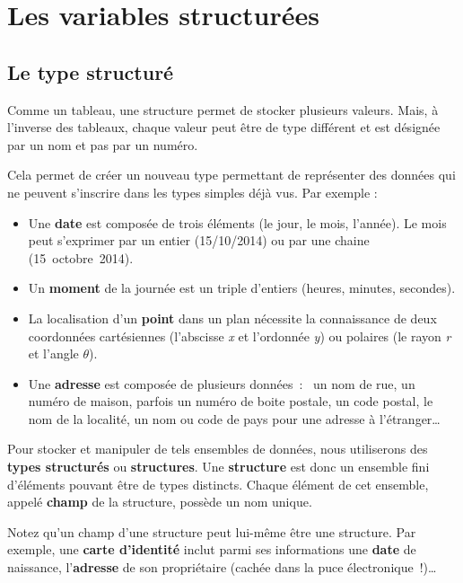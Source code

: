 \chapter{Les variables structurées}

	\section{Le type structuré}
	
		Comme un tableau,
		une structure permet de stocker plusieurs valeurs.
		Mais, à l'inverse des tableaux,
		chaque valeur peut être de type différent
		et est désignée par un nom et pas par un numéro.
		
		Cela permet de créer un nouveau type
		permettant de représenter des données
		qui ne peuvent s'inscrire 
		dans les types simples déjà vus.
		Par exemple :
		\begin{itemize}
		\item
			Une \textbf{date} est composée de trois éléments (le jour, le mois,
			l’année). Le mois peut s'exprimer par un entier (15/10/2014) 
			ou par une chaine (15~octobre~2014).
		\item
			Un \textbf{moment} de la journée est un triple d’entiers 
			(heures, minutes, secondes).
		\item
			La localisation d’un \textbf{point} dans un plan 
			nécessite la connaissance de deux coordonnées cartésiennes 
			(l’abscisse \textit{x} et l’ordonnée \textit{y}) 
			ou polaires 
			(le rayon \textit{r} et l’angle \textit{$\theta$}).
		\item
			Une \textbf{adresse} est composée de plusieurs données~:~
			un nom de rue, 
			un numéro de maison, 
			parfois un numéro de boite postale, 
			un code postal, 
			le nom de la localité, 
			un nom ou code de pays pour une adresse à l’étranger\dots
		\end{itemize}
	
		Pour stocker et manipuler de tels ensembles de données, 
		nous utiliserons des \textbf{types structurés} 
		ou \textbf{structures}. 
		Une \textbf{structure} est donc un ensemble fini d’éléments 
		pouvant être de types distincts. 
		Chaque élément de cet ensemble, 
		appelé \textbf{champ} de la structure, possède un nom unique.
		
		Notez qu’un champ d’une structure peut lui-même être une structure. 
		Par exemple, une \textbf{carte d’identité} inclut 
		parmi ses informations une \textbf{date} de naissance, 
		l’\textbf{adresse} de son propriétaire 
		(cachée dans la puce électronique~!)\dots
	
